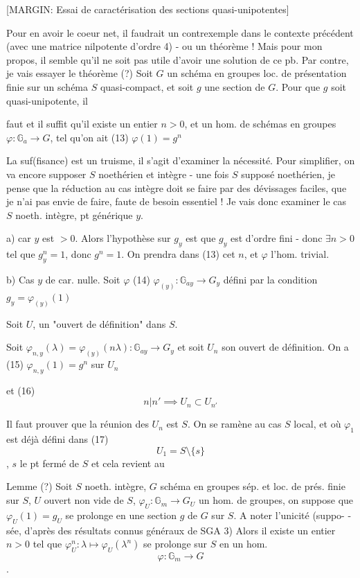 [MARGIN: Essai de caractérisation des sections quasi-unipotentes]

Pour en avoir le coeur net, il faudrait
un contrexemple dans le contexte précédent
(avec une matrice nilpotente d'ordre 4) -
ou un théorème ! Mais pour mon
propos, il semble qu'il ne soit pas
utile d'avoir une solution de ce pb.
Par contre, je vais essayer le
théorème (?) Soit $G$ un schéma en groupes
loc. de présentation finie sur un schéma
$S$ quasi-compact, et soit $g$ une section de
$G$. Pour que $g$ soit quasi-unipotente, il

\newpage


faut et il suffit qu'il existe un entier
$n > 0$, et un hom. de schémas en groupes
$\varphi : \mathbb{G}_a \to G$, tel qu'on ait
(13) $\varphi(1) = g^n$

La suf(fisance) est un truisme, il s'agit d'examiner
la nécessité. Pour simplifier, on va encore
supposer $S$ noethérien et intègre - une
fois $S$ supposé noethérien, je pense que la
réduction au cas intègre doit se faire par
des dévissages faciles, que je n'ai pas envie
de faire, faute de besoin essentiel ! Je vais
donc examiner le cas $S$ noeth. intègre, pt
générique $y$.

a) car $y$ est $> 0$. Alors l'hypothèse
sur $g_y$ est que $g_y$ est d'ordre fini - donc
$\exists n > 0$ tel que $g_y^n = 1$, donc $g^n = 1$. On
prendra dans (13) cet $n$, et $\varphi$ l'hom. trivial.

b) Cas $y$ de car. nulle. Soit $\varphi$
(14) $\varphi_{(y)} : \mathbb{G}_{a y} \to G_y$
défini par la condition
$g_y = \varphi_{(y)}(1)$

Soit $U$, un "ouvert de définition" dans $S$.

Soit
$\varphi_{n, y}(\lambda) = \varphi_{(y)}(n\lambda) : \mathbb{G}_{a y} \to G_y$
et soit $U_n$ son ouvert de définition. On a
(15) $\varphi_{n,y}(1) = g^n$ sur $U_n$

\newpage


et
(16) $$n | n' \implies U_n \subset U_{n'}$$

Il faut prouver que la réunion des $U_n$
est $S$. On se ramène au cas $S$ local,
et où $\varphi_1$ est déjà défini dans
(17) $$U_1 = S \setminus \{s\}$$ , $s$ le pt fermé de $S$
et cela revient au

Lemme (?) Soit $S$ noeth. intègre, $G$ schéma en groupes
sép. et loc. de prés. finie sur $S$, $U$ ouvert non vide de $S$,
$\varphi_U : \mathbb{G}_m \to G_U$ un hom. de groupes, on
suppose que $\varphi_U(1) = g_U$ se prolonge en une
section $g$ de $G$ sur $S$. A noter l'unicité (suppo-
-sée, d'après des résultats connus généraux de
SGA 3) Alors il existe un entier $n > 0$ tel que
$\varphi_U^n : \lambda \mapsto \varphi_U(\lambda^n)$ se prolonge sur $S$ en un hom.
$$\varphi : \mathbb{G}_m \to G$$ .

